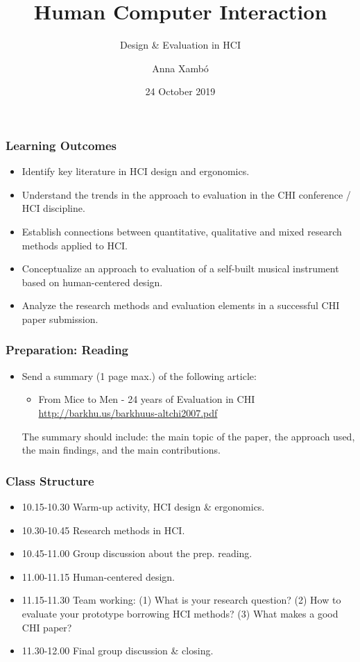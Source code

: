 \documentclass[screen, aspectratio=169]{beamer}
\title[HCI-intro]{Human Computer Interaction}
\subtitle{Design \& Evaluation in HCI}
\author[A. Xamb{\'o}]{Anna Xamb{\'o}}
\institute[NTNU]{Department of Music, NTNU}
\date{24 October 2019}
\begin{document}
\begin{frame}
  \titlepage
\end{frame}


\begin{frame}
\frametitle{Learning Outcomes}
\begin{itemize}
\item Identify key literature in HCI design and ergonomics.
\item Understand the trends in the approach to evaluation in the CHI conference / HCI discipline.
\item Establish connections between quantitative, qualitative and mixed research methods applied to HCI.
\item Conceptualize an approach to evaluation of a self-built musical instrument based on human-centered design.
\item Analyze the research methods and evaluation elements in a successful CHI paper submission.
\end{itemize}
\end{frame}
%
\begin{frame}
\frametitle{Preparation: Reading}
\begin{itemize}
\item Send a summary (1 page max.) of the following article:
\begin{itemize}
\item From Mice to Men - 24 years of Evaluation in CHI~\cite{Barkhuus.Rode.2007.evalchi}\\
\url{http://barkhu.us/barkhuus-altchi2007.pdf} 
\end{itemize}
The summary should include: the main topic of the paper, the approach used, the main findings, and the main contributions.
\end{itemize}
\end{frame}
%
\begin{frame}
\frametitle{Class Structure}
\begin{itemize}
\item 10.15-10.30 Warm-up activity, HCI design \& ergonomics.
\item 10.30-10.45 Research methods in HCI.
\item 10.45-11.00 Group discussion about the prep. reading.
\item 11.00-11.15 Human-centered design.
\item 11.15-11.30 Team working: (1) What is your research question? (2) How to evaluate your prototype borrowing HCI methods? (3) What makes a good CHI paper?
\item 11.30-12.00 Final group discussion \& closing.
\end{itemize}
\end{frame}
\end{document}
